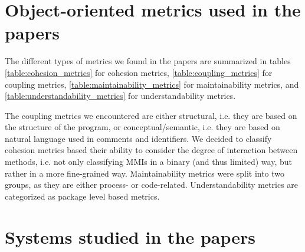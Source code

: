 \section{Object-oriented metrics used in the papers}
\label{categorization_of_metrics}

    The different types of metrics we found in the papers are summarized in tables \ref{table:cohesion_metrics} for cohesion metrics, \ref{table:coupling_metrics} for coupling metrics, \ref{table:maintainability_metrics} for maintainability metrics, and \ref{table:understandability_metrics} for understandability metrics.
    
    The coupling metrics we encountered are either structural, i.e. they are based on the structure of the program, or conceptual/semantic, i.e. they are based on natural language used in comments and identifiers. We decided to classify cohesion metrics based their ability to consider the degree of interaction between methods, i.e. not only classifying MMIs in a binary (and thus limited) way, but rather in a more fine-grained way. Maintainability metrics were split into two groups, as they are either process- or code-related. Understandability metrics are categorized as package level based metrics.
    
    
        
    
    
\section{Systems studied in the papers}
\label{categorization_of_SUS}
    
